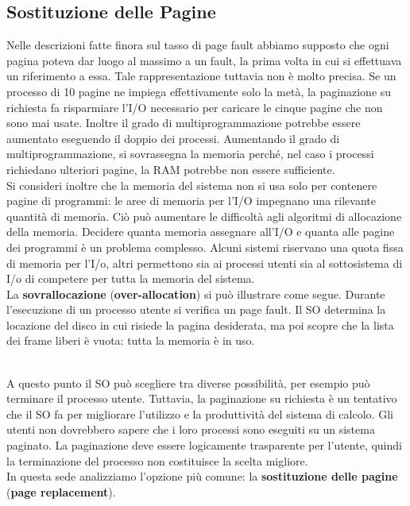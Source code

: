 \documentclass{article}
\begin{document}
		\subsection{Sostituzione delle Pagine}
			Nelle descrizioni fatte finora sul tasso di page fault abbiamo supposto che ogni pagina poteva dar luogo al massimo a un fault, la prima volta in cui si effettuava un riferimento a essa. Tale rappresentazione tuttavia non è molto precisa. Se un processo di 10 pagine ne impiega effettivamente solo la metà, la paginazione su richiesta fa risparmiare l’I/O necessario per caricare le cinque pagine che non sono mai usate. Inoltre il grado di multiprogrammazione potrebbe essere aumentato eseguendo il doppio dei processi. Aumentando il grado di multiprogrammazione, si sovrassegna la memoria perché, nel caso i processi richiedano ulteriori pagine, la RAM potrebbe non essere sufficiente.
			\\Si consideri inoltre che la memoria del sistema non si usa solo per contenere pagine di programmi: le aree di memoria per l’I/O impegnano una rilevante quantità di memoria. Ciò può aumentare le difficoltà agli algoritmi di allocazione della memoria. Decidere quanta memoria assegnare all’I/O e quanta alle pagine dei programmi è un problema complesso. Alcuni sistemi riservano una quota fissa di memoria per l’I/o, altri permettono sia ai processi utenti sia al sottosistema di I/o di competere per tutta la memoria del sistema.
			\\La \textbf{sovrallocazione} (\textbf{over-allocation}) si può illustrare come segue. Durante l’esecuzione di un processo utente si verifica un page fault. Il SO determina la locazione del disco in cui risiede la pagina desiderata, ma poi scopre che la lista dei frame liberi è vuota: tutta la memoria è in uso. 
			\begin{figure}[ht!]
			\end{figure}
			\\A questo punto il SO può scegliere tra diverse possibilità, per esempio può terminare il processo utente. Tuttavia, la paginazione su richiesta è un tentativo che il SO fa per migliorare l’utilizzo e la produttività del sistema di calcolo. Gli utenti non dovrebbero sapere che i loro processi sono eseguiti su un sistema paginato. La paginazione deve essere logicamente trasparente per l’utente, quindi la terminazione del processo non costituisce la scelta migliore.
			\\In questa sede analizziamo l’opzione più comune: la \textbf{sostituzione delle pagine} (\textbf{page replacement}).
\end{document}
